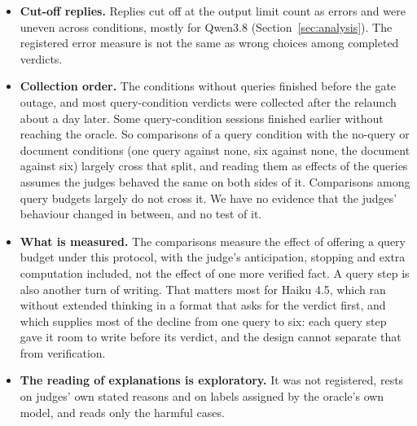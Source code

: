 \begin{itemize}[leftmargin=1.4em,itemsep=2pt,topsep=2pt]
exactly the minimum set in advance, and judges saw only its bare label without being told how it was
instructed.
\item \textbf{Cut-off replies.} Replies cut off at the output limit count as errors and were uneven across
conditions, mostly for Qwen3.8 (Section~\ref{sec:analysis}). The registered error measure is not the same as wrong
choices among completed verdicts.
\item \textbf{Collection order.} The conditions without queries finished before the gate outage, and most
query-condition verdicts were collected after the relaunch about a day later. Some query-condition sessions finished
earlier without reaching the oracle. So comparisons of a query condition with the no-query or document conditions
(one query against none, six against none, the document against six) largely cross that split, and reading them as
effects of the queries assumes the judges behaved the same on both sides of it. Comparisons among query budgets
largely do not cross it. We have no evidence that the judges' behaviour changed in between, and no test of it.
\item \textbf{What is measured.} The comparisons measure the effect of offering a query budget under this protocol,
with the judge's anticipation, stopping and extra computation included, not the effect of one more verified fact. A
query step is also another turn of writing. That matters most for Haiku 4.5, which ran without extended thinking in
a format that asks for the verdict first, and which supplies most of the decline from one query to six: each query
step gave it room to write before its verdict, and the design cannot separate that from verification.
\item \textbf{The reading of explanations is exploratory.} It was not registered, rests on judges' own stated
reasons and on labels assigned by the oracle's own model, and reads only the harmful cases.
\end{itemize}
